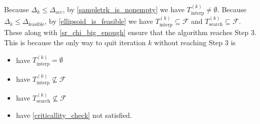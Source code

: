 \documentclass{article}
\newtheorem{definition}[theorem]{Definition}
\newtheorem{lemma}[theorem]{Lemma}
\theoremstyle{case}
\numberwithin{theorem}{subsection}
\newcommand{\dacc}{{\Delta_{\textrm{acc}}}}
\newcommand{\dfeas}{{\Delta_{\textrm{feasible}}}}
\newcommand{\dk}{\Delta_k}
\newcommand{\feasiblek}{{\mathcal F_m^{(k)}}}
\newcommand{\feasible}{{\mathcal F}}
\newcommand{\gk}{{\nabla m_f^{(k)}\left(\xk\right)}}
\newcommand{\mfk}{{{m}_f}^{(k)}}
\newcommand{\sampletrk}{{T_{\text{interp}}^{(k)}}}
\newcommand{\searchtrk}{{T_{\text{search}}^{(k)}}}
\newcommand{\xk}{x^{(k)}}
\begin{document}
% 




\color{red}
Because $\dk \le \dacc$, by \cref{sampletrk_is_nonempty} we have $\sampletrk \ne \emptyset$.
Because $\dk \le \dfeas$, by \cref{ellipsoid_is_feasible} we have $\sampletrk \subseteq \feasible$ and $\searchtrk \subseteq \feasible$.
These along with \cref{sr_chi_big_enough} ensure that the algorithm reaches Step 3.
This is because the only way to quit iteration $k$ without reaching Step 3 is
\begin{itemize}
\item have $\sampletrk = \emptyset$
\item have $\sampletrk \not \subseteq \feasible$
\item have $\searchtrk \not \subseteq \feasible$
\item have \cref{criticallity_check} not satisfied.
\end{itemize}
\color{black}
\end{document}
